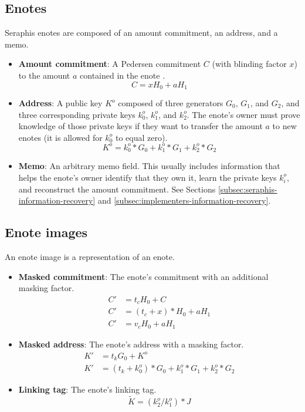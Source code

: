 \subsection{Enotes}
\label{subsec:seraphis-enotes}

Seraphis enotes are composed of an amount commitment, an address, and a memo.

\begin{itemize}
    \item \textbf{Amount commitment}: A Pedersen commitment $C$ (with blinding factor $x$) to the amount $a$ contained in the enote \cite{Pedersen1992, maxwell-ct-2}.
    \[C = x H_0 + a H_1\]

    \item \textbf{Address}: A public key $K^o$ composed of three generators $G_0$, $G_1$, and $G_2$, and three corresponding private keys $k^o_0$, $k^o_1$, and $k^o_2$. The enote's owner must prove knowledge of those private keys if they want to transfer the amount $a$ to new enotes (it is allowed for $k^o_0$ to equal zero).\vspace{.115cm}
    \[K^o = k^o_0*G_0 + k^o_1*G_1 + k^o_2*G_2\]

    \item \textbf{Memo}: An arbitrary memo field. This usually includes information that helps the enote's owner identify that they own it, learn the private keys $k^o_i$, and reconstruct the amount commitment. See Sections \ref{subsec:seraphis-information-recovery} and \ref{subsec:implementers-information-recovery}.
\end{itemize}


\subsection{Enote images}
\label{subsec:seraphis-enote-images}

An enote image is a representation of an enote.

\begin{itemize}
    \item \textbf{Masked commitment}: The enote's commitment with an additional masking factor.\vspace{.115cm}
    \begin{align*}
        C' &= t_c H_0 + C \\
        C' &= (t_c + x)*H_0 + a H_1 \\
        C' &= v_c H_0 + a H_1
    \end{align*}

    \item \textbf{Masked address}: The enote's address with a masking factor.\vspace{.115cm}
    \begin{align*}
        K' &= t_k G_0 + K^o \\
        K' &= (t_k + k^o_0)*G_0 + k^o_1*G_1 + k^o_2*G_2
    \end{align*}

    \item \textbf{Linking tag}: The enote's linking tag.\vspace{.115cm}
    \[\tilde{K} = (k^o_2/k^o_1)*J\]
\end{itemize}

